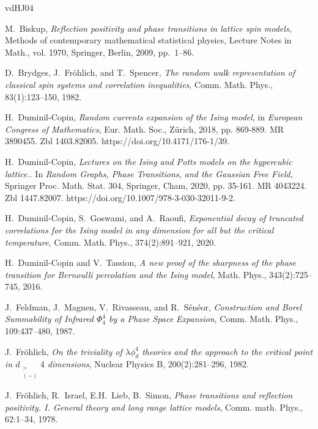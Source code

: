 \documentclass[a4paper,oneside,11pt]{article}
\numberwithin{equation}{section}
\numberwithin{equation}{section}
\numberwithin{equation}{section}
\begin{document}
\begin{thebibliography}{vdHJ04}
%  
 
M.~Biskup, \emph{Reflection positivity and phase transitions in lattice spin
  models}, Methods of contemporary mathematical statistical physics, Lecture
  Notes in Math., vol. 1970, Springer, Berlin, 2009, pp.~1--86. 
  
D.~Brydges, J.~Fr{\"o}hlich, and T.~Spencer, \emph{The random walk  representation of classical spin systems and correlation inequalities},   Comm. Math. Phys., 83(1):123--150, 1982. 

 H.~Duminil-Copin, {\em Random currents expansion of the Ising model}, 
 in {\it European Congress of Mathematics}, Eur. Math. Soc., Z\"urich, 2018, pp. 869-889. MR 3890455. Zbl 1403.82005. https://doi.org/10.4171/176-1/39. 

H.~Duminil-Copin, {\em Lectures on the Ising and Potts models on the hypercubic lattice.}.  In {\it Random Graphs, Phase Transitions, and the Gaussian Free Field}, Springer Proc. Math. Stat. 304, Springer, Cham, 2020, pp. 35-161. MR 4043224. Zbl 1447.82007. https://doi.org/10.1007/978-3-030-32011-9-2.

H.~{Duminil-Copin}, S.~Goswami, and A.~Raoufi, 
{\em Exponential decay of truncated correlations for the Ising model in any dimension for all but the critical temperature}, Comm. Math. Phys., 374(2):891--921, 2020.

H.~{Duminil-Copin} and V.~Tassion, \emph{A new proof of the sharpness of the
  phase transition for {B}ernoulli percolation and the {I}sing model},
 {M}ath. {P}hys., 343(2):725--745, 2016.
  
J.~Feldman, J.~Magnen, V.~Rivasseau, and R.~S\'en\'eor,
{\em Construction and Borel Summability of Infrared $\Phi_4^4$ by a Phase Space Expansion},
  Comm. Math. Phys., 109:437--480, 1987.

J.~Fr\"ohlich, \emph{On the triviality of $\lambda\phi^4_d$ theories and the
  approach to the critical point in $d_{\substack{>\\(-)} }4$ dimensions}, Nuclear Physics B,
  200(2):281--296, 1982.

J.~Fr\"ohlich, R.~Israel, E.H.~Lieb, B.~Simon,
{\em Phase transitions and reflection positivity. I. General theory and long range lattice models},
  Comm. math. Phys., 62:1--34, 1978. 


\end{thebibliography}
\end{document}
